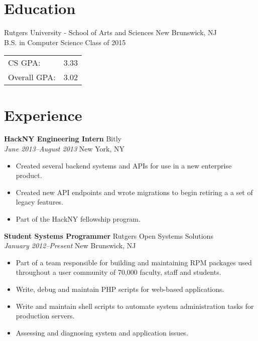 \documentclass[centered,overlapped]{res}
\begin{document}

\address{153 Riveredge Road \\ Tinton Falls, NJ 07724}
\address{josh@jmatthews.us \\ github.com/jmatth}

\begin{resume}


\section{Education}

Rutgers University - School of Arts and Sciences \hfill New Brunswick, NJ\\
B.S. in Computer Science \hfill Class of 2015 \\
\begin{tabular}{l l}
	CS GPA: & 3.33 \\
	Overall GPA: & 3.02 \\
\end{tabular}

\section{Experience}

{\bf HackNY Engineering Intern} \hfill Bitly\\
\textit{June 2013--August 2013} \hfill New York, NY
\begin{itemize} \itemsep -2pt %
	\item Created several backend systems and APIs for use in a new enterprise
        product.
    \item Created new API endpoints and wrote migrations to begin retiring a
        a set of legacy features.
    \item Part of the HackNY fellowship program.
\end{itemize}

{\bf Student Systems Programmer} \hfill Rutgers Open Systems Solutions\\
\textit{January 2012--Present} \hfill New Brunswick, NJ
\begin{itemize} \itemsep -2pt %
	\item Part of a team responsible for building and maintaining RPM packages used throughout a user community of 70,000 faculty, staff and students.
	\item Write, debug and maintain PHP scripts for web-based applications.
	\item Write and maintain shell scripts to automate system administration tasks for production servers.
	\item Assessing and diagnosing system and application issues.
\end{itemize}


\end{resume}
\end{document}
